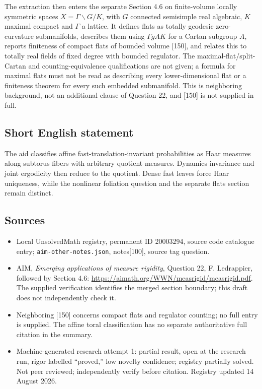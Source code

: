 \documentclass[11pt]{article}
\begin{document}
The extraction then enters the separate Section 4.6 on finite-volume locally symmetric spaces $X=\Gamma\backslash G/K$, with $G$ connected semisimple real algebraic, $K$ maximal compact and $\Gamma$ a lattice. It defines flats as totally geodesic zero-curvature submanifolds, describes them using $\Gamma gAK$ for a Cartan subgroup $A$, reports finiteness of compact flats of bounded volume [150], and relates this to totally real fields of fixed degree with bounded regulator. The maximal-flat/split-Cartan and counting-equivalence qualifications are not given; a formula for maximal flats must not be read as describing every lower-dimensional flat or a finiteness theorem for every such embedded submanifold. This is neighboring background, not an additional clause of Question 22, and [150] is not supplied in full.
\subsection{Short English statement}
The aid classifies affine fast-translation-invariant probabilities as Haar measures along subtorus fibers with arbitrary quotient measures. Dynamics invariance and joint ergodicity then reduce to the quotient. Dense fast leaves force Haar uniqueness, while the nonlinear foliation question and the separate flats section remain distinct.
\subsection{Sources}
\begin{itemize}
\item Local UnsolvedMath registry, permanent ID 20003294, source code catalogue entry; \texttt{aim-other-notes.json}, notes[100], source tag question.
\item AIM, \emph{Emerging applications of measure rigidity}, Question 22, F. Ledrappier, followed by Section 4.6: \url{https://aimath.org/WWN/measrigid/measrigid.pdf}. The supplied verification identifies the merged section boundary; this draft does not independently check it.
\item Neighboring [150] concerns compact flats and regulator counting; no full entry is supplied. The affine toral classification has no separate authoritative full citation in the summary.
\item Machine-generated research attempt 1: partial result, open at the research run, rigor labelled ``proved,'' low novelty confidence; registry partially solved. Not peer reviewed; independently verify before citation. Registry updated 14 August 2026.
\end{itemize}
\end{document}
